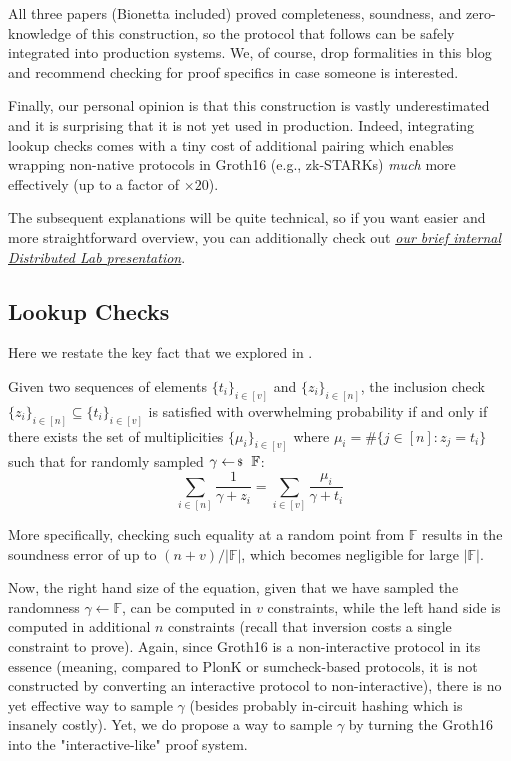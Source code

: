 \documentclass[../../book]{subfiles}
\begin{document}
All three papers (Bionetta included) proved completeness, soundness, and
zero-knowledge of this construction, so the protocol that follows can be safely
integrated into production systems. We, of course, drop formalities in this blog
and recommend checking \cite{mirageplus} for proof specifics in case someone is interested.

Finally, our personal opinion is that this construction is vastly underestimated
and it is surprising that it is not yet used in production. Indeed, integrating
lookup checks comes with a tiny cost of additional pairing which enables
wrapping non-native protocols in Groth16 (e.g., zk-STARKs) \textit{much} more
effectively (up to a factor of $\times 20$). 

\begin{remark}
The subsequent explanations will be quite technical, so if you want easier and
more straightforward overview, you can additionally check out
\href{https://github.com/ZamDimon/presentations-and-talks/blob/main/ultragroth/ultragroth-static.pdf}{\textit{our
brief internal Distributed Lab presentation}}.
\end{remark}

\subsection{Lookup Checks}

Here we restate the key fact that we explored in .

\begin{theorem} 
    Given two sequences of elements $\{t_i\}_{i \in [v]}$ and $\{z_i\}_{i \in
    [n]}$, the inclusion check $\{z_i\}_{i \in [n]} \subseteq \{t_i\}_{i \in
    [v]}$ is satisfied with overwhelming probability if and only if there exists
    the set of multiplicities $\{\mu_i\}_{i \in [v]}$ where $\mu_i = \#\{j \in
    [n]: z_j = t_i\}$ such that for randomly sampled $\gamma \leftarrowS
    \mathbb{F}$:
\[
    \sum_{i \in [n]} \frac{1}{\gamma+z_i} = \sum_{i \in [v]} \frac{\mu_i}{\gamma+t_i}
\]
\end{theorem}

More specifically, checking such equality at a random point from $\mathbb{F}$
results in the soundness error of up to $(n+v)/|\mathbb{F}|$, which becomes
negligible for large $|\mathbb{F}|$.

Now, the right hand size of the equation, given that we have sampled the
randomness $\gamma \gets \mathbb{F}$, can be computed in $v$ constraints, while
the left hand side is computed in additional $n$ constraints (recall that
inversion costs a single constraint to prove). Again, since Groth16 is a
non-interactive protocol in its essence (meaning, compared to PlonK or
sumcheck-based protocols, it is not constructed by converting an interactive
protocol to non-interactive), there is no yet effective way to sample $\gamma$
(besides probably in-circuit hashing which is insanely costly). Yet, we do
propose a way to sample $\gamma$ by turning the Groth16 into the
"interactive-like" proof system.
\end{document}
